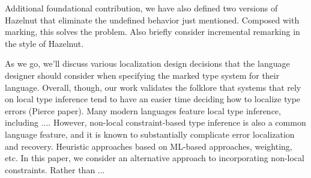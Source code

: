Additional foundational contribution, we have also defined two versions of Hazelnut that eliminate the undefined behavior just mentioned. Composed with marking, this solves the problem. Also briefly consider incremental remarking in the style of Hazelnut.

As we go, we'll discuss various localization design decisions that the language designer should consider when specifying the marked type system for their language. Overall, though, our work validates the folklore that systems that rely on local type inference tend to have an easier time deciding how to localize type errors (Pierce paper). Many modern languages feature local type inference, including .... 
However, non-local constraint-based type inference is also a common language feature, and it is known to substantially complicate error localization and recovery. 
Heuristic approaches based on ML-based approaches, weighting, etc.
In this paper, we consider an alternative approach to incorporating non-local constraints. Rather than ...

